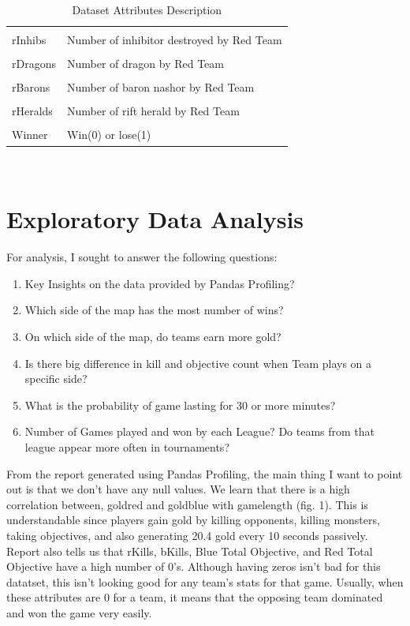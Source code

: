 \documentclass[conference]{IEEEtran}
\begin{document}
\begin{table}[!ht]
\begin{tabular}{|| l | l ||}
        \hline
        \\[-1em]
        rInhibs & Number of inhibitor destroyed by Red Team \\
        \hline
        \\[-1em]
        rDragons & Number of dragon by Red Team\\
        \hline
        \\[-1em]
        rBarons & Number of baron nashor by Red Team\\
        \hline
        \\[-1em]
        rHeralds & Number of rift herald by Red Team\\
        \hline
        \\[-1em]
        Winner & Win(0) or lose(1)\\    
        \hline
    \end{tabular}
    \\[1em]
    \caption{Dataset Attributes Description}
    \label{table:1}
\end{table}
    
\section{\textbf{Exploratory Data Analysis}}
For analysis, I sought to answer the following questions:

\begin{enumerate}
    \item Key Insights on the data provided by Pandas Profiling?
    \item Which side of the map has the most number of wins?
    \item On which side of the map, do teams earn more gold?
    \item Is there big difference in kill and objective count when Team plays on a specific side?
    \item What is the probability of game lasting for 30 or more minutes?
    \item Number of Games played and won by each League? Do teams from that league appear more often in tournaments?
\end{enumerate}

From the report generated using Pandas Profiling, the main thing I want to point out is that we don't have any null values. We learn that there is a high correlation between, goldred and goldblue with gamelength (fig. 1). This is understandable since players gain gold by killing opponents, killing monsters, taking objectives, and also generating 20.4 gold every 10 seconds passively. Report also tells us that rKills, bKills, Blue Total Objective, and Red Total Objective have a high number of 0's. Although having zeros isn't bad for this datatset, this isn't looking good for any team's stats for that game. Usually, when these attributes are 0 for a team, it means that the opposing team dominated and won the game very easily.
\end{document}
